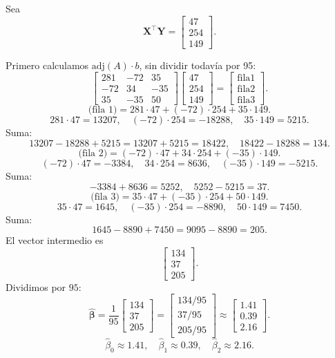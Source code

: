 \documentclass[10pt,a4paper]{article}
\begin{document}
\begin{enumerate}
\begin{enumerate}
Sea
\[
\mathbf{X}^\top \mathbf{Y}
=
\begin{bmatrix}
47\\
254\\
149
\end{bmatrix}.
\]

Primero calculamos 
\(\mathrm{adj}(A)\cdot b\),
sin dividir todavía por 95:
\[
\begin{bmatrix}
281 & -72 & 35\\
-72 & 34 & -35\\
35 & -35 & 50
\end{bmatrix}
\begin{bmatrix}
47\\
254\\
149
\end{bmatrix}
=
\begin{bmatrix}
\text{fila1}\\
\text{fila2}\\
\text{fila3}
\end{bmatrix}.
\]
\[
\text{(fila 1)} 
= 281\cdot47 + (-72)\cdot254 + 35\cdot149.
\]
\[
281\cdot47=13207,\quad
(-72)\cdot254=-18288,\quad
35\cdot149=5215.
\]
Suma:
\[
13207 -18288 +5215= 13207 +5215=18422,\quad 18422-18288=134.
\]
\[
\text{(fila 2)}
= (-72)\cdot47 +34\cdot254 +(-35)\cdot149.
\]
\[
(-72)\cdot47=-3384,\quad
34\cdot254=8636,\quad
(-35)\cdot149=-5215.
\]
Suma:
\[
-3384+8636=5252,\quad 5252-5215=37.
\]
\[
\text{(fila 3)}
= 35\cdot47 +(-35)\cdot254 +50\cdot149.
\]
\[
35\cdot47=1645,\quad
(-35)\cdot254=-8890,\quad
50\cdot149=7450.
\]
Suma:
\[
1645-8890 +7450=9095-8890=205.
\]
El vector intermedio es
\[
\begin{bmatrix}
134\\
37\\
205
\end{bmatrix}.
\]
Dividimos por $95$:
\[
\hat{\boldsymbol{\beta}}
=
\frac{1}{95}
\begin{bmatrix}
134\\
37\\
205
\end{bmatrix}
=
\begin{bmatrix}
134/95\\
37/95\\
205/95
\end{bmatrix}
\approx
\begin{bmatrix}
1.41\\
0.39\\
2.16
\end{bmatrix}.
\]
\[
\boxed{
\hat{\beta}_0 \approx 1.41,
\quad
\hat{\beta}_1 \approx 0.39,
\quad
\hat{\beta}_2 \approx 2.16.
}
\]




\end{enumerate}
\end{enumerate}
\end{document}
